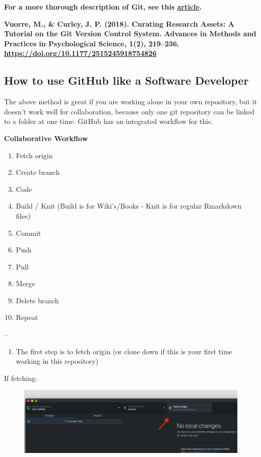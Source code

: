 \documentclass[]{book}
\providecommand{\tightlist}{%
  \setlength{\itemsep}{0pt}\setlength{\parskip}{0pt}}
\begin{document}
\textbf{For a more thorough description of Git, see this \href{https://vuorre.netlify.app/publication/2018/06/01/curating-research-assets-a-tutorial-on-the-git-version-control-system/vuorre-curating-research-assets-2018.pdf}{article}.}

\textbf{Vuorre, M., \& Curley, J. P. (2018). Curating Research Assets: A Tutorial on the Git Version Control System. Advances in Methods and Practices in Psychological Science, 1(2), 219--236. \url{https://doi.org/10.1177/2515245918754826}}

\hypertarget{how-to-use-github-like-a-software-developer}{%
\subsection{How to use GitHub like a Software Developer}\label{how-to-use-github-like-a-software-developer}}

The above method is great if you are working alone in your own repository, but it doesn't work well for collaboration, because only one git repository can be linked to a folder at one time. GitHub has an integrated workflow for this.

\textbf{Collaborative Workflow}

\begin{enumerate}
\def\labelenumi{\arabic{enumi}.}
\tightlist
\item
  Fetch origin
\item
  Create branch
\item
  Code
\item
  Build / Knit (Build is for Wiki's/Books - Knit is for regular Rmarkdown files)
\item
  Commit
\item
  Push
\item
  Pull
\item
  Merge
\item
  Delete branch
\item
  Repeat
\end{enumerate}

--

\begin{enumerate}
\def\labelenumi{\arabic{enumi}.}
\tightlist
\item
  The first step is to fetch origin (or clone down if this is your first time working in this repository)
\end{enumerate}

If fetching:

\begin{figure}
\centering
\includegraphics{images/research_protocols/github/30.png}
\caption{}
\end{figure}
\end{document}

